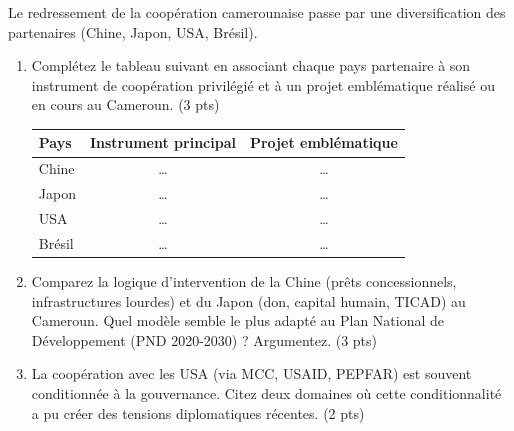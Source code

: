 \documentclass[11pt]{article}
\begin{document}
\begin{exercice}
Le redressement de la coopération camerounaise passe par une diversification des partenaires (Chine, Japon, USA, Brésil).

\begin{enumerate}
\item Complétez le tableau suivant en associant chaque pays partenaire à son instrument de coopération privilégié et à un projet emblématique réalisé ou en cours au Cameroun. (3 pts)
\begin{center}
\begin{tabular}{|l|c|c|}
\hline
\textbf{Pays} & \textbf{Instrument principal} & \textbf{Projet emblématique} \\
\hline
Chine & \dots & \dots \\
\hline
Japon & \dots & \dots \\
\hline
USA & \dots & \dots \\
\hline
Brésil & \dots & \dots \\
\hline
\end{tabular}
\end{center}
\item Comparez la logique d'intervention de la Chine (prêts concessionnels, infrastructures lourdes) et du Japon (don, capital humain, TICAD) au Cameroun. Quel modèle semble le plus adapté au Plan National de Développement (PND 2020-2030) ? Argumentez. (3 pts)
\item La coopération avec les USA (via MCC, USAID, PEPFAR) est souvent conditionnée à la gouvernance. Citez deux domaines où cette conditionnalité a pu créer des tensions diplomatiques récentes. (2 pts)
\end{enumerate}
\end{exercice}
\end{document}
